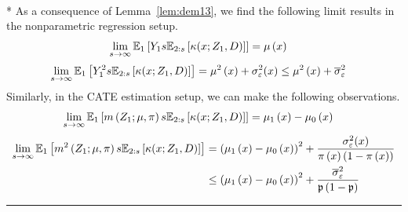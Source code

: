 \begin{lem}\label{lem:limit_res}\mbox{}\\*
	As a consequence of Lemma~\ref{lem:dem13}, we find the following limit results in the nonparametric regression setup.
	\begin{equation}
		\begin{aligned}
			\lim_{s \rightarrow \infty} \mathbb{E}_{1}\left[Y_1 s \mathbb{E}_{2:s}\left[\kappa(x; Z_1, D)\right]\right]
			& = \mu\left(x\right)
		\end{aligned}
	\end{equation}
	\begin{equation}
		\begin{aligned}
			\lim_{s \rightarrow \infty} \mathbb{E}_{1}\left[Y_1^2 s \mathbb{E}_{2:s}\left[\kappa(x; Z_1, D)\right]\right]
			& = \mu^2\left(x\right) + \sigma_{\varepsilon}^{2}(x)
			\leq \mu^2\left(x\right) + \overline{\sigma}_{\varepsilon}^{2}
		\end{aligned}
	\end{equation}
	Similarly, in the CATE estimation setup, we can make the following observations.
	\begin{equation}
		\begin{aligned}
			\lim_{s \rightarrow \infty} \mathbb{E}_{1}\left[m\left(Z_{1}; \mu, \pi\right) s \mathbb{E}_{2:s}\left[\kappa(x; Z_1, D)\right]\right]
			& = \mu_1\left(x\right) - \mu_0\left(x\right)
		\end{aligned}
	\end{equation}          
	\begin{equation}
		\begin{aligned}
			\lim_{s \rightarrow \infty} \mathbb{E}_{1}\left[m^2\left(Z_{1}; \mu, \pi\right) s \mathbb{E}_{2:s}\left[\kappa(x; Z_1, D)\right]\right]
			& = \left(\mu_1\left(x\right) - \mu_0\left(x\right)\right)^2 + \frac{\sigma_{\varepsilon}^2(x)}{\pi\left(x\right)\left(1 - \pi\left(x\right)\right)}\\
			& \leq \left(\mu_1\left(x\right) - \mu_0\left(x\right)\right)^2 + \frac{\overline{\sigma}_{\varepsilon}^2}{\mathfrak{p}\left(1 - \mathfrak{p}\right)}
		\end{aligned}
	\end{equation}
\end{lem}

\hrule

